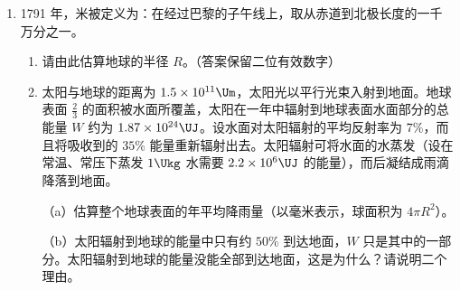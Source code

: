 \documentclass[\gkver]{gaokaozhenti}
\begin{document}
\begin{enumerate}
{②将砝码放在转换器上，记下输出电压 $U_{0}$；

③将待测物放在转换器上，记下输出电压 $U_{1}$。

由 $U_{0}=km_{0}g$，得 $k=\frac{U_{0}}{m_{0}g}$；测得 $U=kmg$，所以 $m=\frac{m_{0}U}{U_{0}}$。

（3）①因电源电压不够而输出电压调不到零；②待测物体质量超出转换器量程。

本题考查包含传感器的实验电路的设计、测试和测量及设计实验能力和创新能力，要求力电转换器的输入电压可调，并且使电压的调节范围尽可能大，所以把滑动变阻器接在输入端并且接成分压电路。
}

\item
1791 年，米被定义为：在经过巴黎的子午线上，取从赤道到北极长度的一千万分之一。
\begin{enumerate}
	\item
	请由此估算地球的半径 $R$。（答案保留二位有效数字）
	\item
	太阳与地球的距离为 $1.5\times10^{11}\Um$，太阳光以平行光束入射到地面。地球表面 $\frac{2}{3}$ 的面积被水面所覆盖，太阳在一年中辐射到地球表面水面部分的总能量 $W$ 约为 $1.87\times10^{24}\UJ$。设水面对太阳辐射的平均反射率为 $7\%$，而且将吸收到的 $35\%$ 能量重新辐射出去。太阳辐射可将水面的水蒸发（设在常温、常压下蒸发 $1\Ukg$ 水需要 $2.2\times10^{6}\UJ$ 的能量），而后凝结成雨滴降落到地面。

	（a）估算整个地球表面的年平均降雨量（以毫米表示，球面积为 $4\pi R^{2}$）。

	（b）太阳辐射到地球的能量中只有约 $50\%$ 到达地面，$W$ 只是其中的一部分。太阳辐射到地球的能量没能全部到达地面，这是为什么？请说明二个理由。
\end{enumerate}

\end{enumerate}
\end{document}
